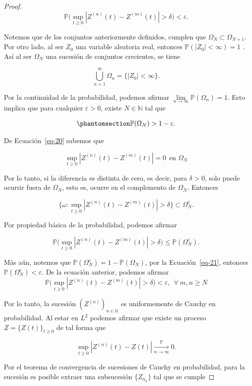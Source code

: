 \documentclass[
  spanish,
  us-letterpaper,
]{scrreprt}
\theoremstyle{plain}
\theoremstyle{plain}
\theoremstyle{definition}
\theoremstyle{plain}
\theoremstyle{remark}
\begin{document}
\begin{proof}
\[
    \mathbb{P}\Bigg(\sup\limits_{t\geq 0}|Z^{(n)}(t)-Z^{(m)}(t)|>\delta\Bigg)<\varepsilon.
\]

Notemos que de los conjuntos anteriormente definidos, cumplen que
\(\Omega_N\subset \Omega_{N+1}\). Por otro lado, al ser \(Z_0\) una
variable aleatoria real, entonces \(\mathbb{P}(|Z_0|<\infty)=1\) . Así
al ser \(\Omega_N\) una sucesión de conjuntos crecientes, se tiene

\[
    \bigcup\limits_{n=1}^{\infty}\Omega_n=\{|Z_0|<\infty\}.
\]

Por la continuidad de la probabilidad, podemos afirmar
\(\displaystyle \lim\limits_{n\rightarrow \infty}\mathbb{P}(\Omega_n)=1\).
Esto implica que para cualquier \(\varepsilon>0\), existe
\(N\in \mathbb{N}\) tal que

\begin{equation}\phantomsection\label{eq-21}{
    \mathbb{P}(\Omega_N)>1-\varepsilon.
}\end{equation}

De Ecuación~\ref{eq-20} sabemos que

\[
\sup\limits_{t\geq 0}|Z^{(n)}(t)-Z^{(m)}(t)|=0\ \ \text{en $\Omega_N$}
\]

Por lo tanto, si la diferencia es distinta de cero, es decir, para
\(\delta>0\), solo puede ocurrir fuera de \(\Omega_N\), esto es, ocurre
en el complemento de \(\Omega_N\). Entonces

\[
\Bigg\{\omega:\sup\limits_{t\geq 0}|Z^{(n)}(t)-Z^{(m)}(t)|>\delta\Bigg\}\subset \Omega_N^{c}.
\]

Por propiedad básica de la probabilidad, podemos afirmar

\[
\mathbb{P}\Bigg(\sup\limits_{t\geq 0}|Z^{(n)}(t)-Z^{(m)}(t)|>\delta\Bigg)\leq\mathbb{P}(\Omega_N^c).
\]

Más aún, notemos que \(\mathbb{P}(\Omega_N^c)=1-\mathbb{P}(\Omega_N)\),
por la Ecuación~\ref{eq-21}, entonces
\(\mathbb{P}(\Omega_N^c)<\varepsilon\). De la ecuación anterior, podemos
afirmar \[
    \mathbb{P}\Bigg(\sup\limits_{t\geq 0}|Z^{(n)}(t)-Z^{(m)}(t)|>\delta\Bigg)<\varepsilon, \ \ \forall\ m,n\geq N
\]

Por lo tanto, la sucesión \((Z^{(n)})_{n\in \mathbb{N}}\) es
uniformemente de Cauchy en probabilidad. Al estar en \(L^2\) podemos
afirmar que existe un proceso \(Z=\{Z(t)\}_{t\geq 0}\) de tal forma que

\[
    \sup\limits_{t\geq 0}|Z^{(n)}(t)-Z(t)| \xrightarrow[n \to \infty]{\mathbb{P}} 0.
\]

Por el teorema de convergencia de sucesiones de Cauchy en probabilidad,
para la sucesión es posible extraer una subsucesión \(\{Z_{n_k}\}\) tal
que se cumple


\end{proof}
\end{document}
